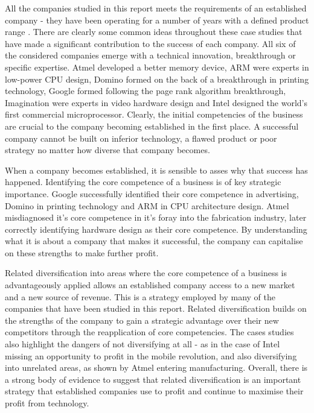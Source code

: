 {}

All the companies studied in this report meets the requirements of an established company - they have been operating for a number of years with a defined product range \cite{kekale2007successful}.
There are clearly some common ideas throughout these case studies that have made a significant contribution to the success of each company.
All six of the considered companies emerge with a technical innovation, breakthrough or specific expertise.
Atmel developed a better memory device, ARM were experts in low-power CPU design, Domino formed on the back of a breakthrough in printing technology, Google formed following the page rank algorithm breakthrough, Imagination were experts in video hardware design and Intel designed the world's first commercial microprocessor.
Clearly, the initial competencies of the business are crucial to the company becoming established in the first place.
A successful company cannot be built on inferior technology, a flawed product or poor strategy no matter how diverse that company becomes.

When a company becomes established, it is sensible to asses why that success has happened.
Identifying the core competence of a business is of key strategic importance. 
Google successfully identified their core competence in advertising, Domino in printing technology and ARM in CPU architecture design. 
Atmel misdiagnosed it's core competence in it's foray into the fabrication industry, later correctly identifying hardware design as their core competence.
By understanding what it is about a company that makes it successful, the company can capitalise on these strengths to make further profit.

Related diversification into areas where the core competence of a business is advantageously applied allows an established company access to a new market and a new source of revenue.
This is a strategy employed by many of the companies that have been studied in this report.
Related diversification builds on the strengths of the company to gain a strategic advantage over their new competitors through the reapplication of core competencies.
The cases studies also highlight the dangers of not diversifying at all - as in the case of Intel missing an opportunity to profit in the mobile revolution, and also diversifying into unrelated areas, as shown by Atmel entering manufacturing.
Overall, there is a strong body of evidence to suggest that related diversification is an important strategy that established companies use to profit and continue to maximise their profit from technology.


